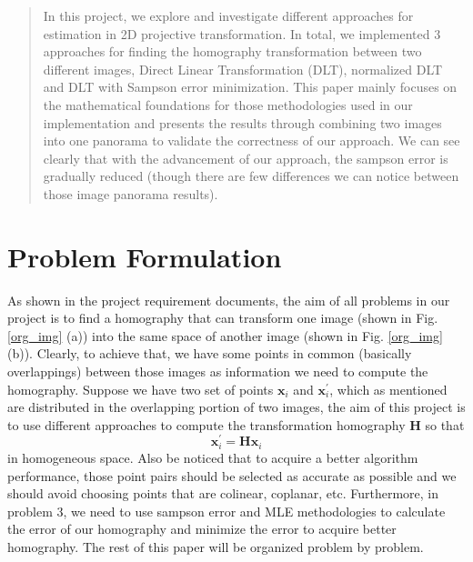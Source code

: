 \documentclass[conference]{IEEEtran}
\newcommand{\mat}[1]{\mathbf{#1}} %
\begin{document}




\maketitle
\begin{abstract}
In this project, we explore and investigate different approaches for estimation in 2D projective transformation. In total, we implemented 3 approaches for finding the homography transformation between two different images, Direct Linear Transformation (DLT), normalized DLT and DLT with Sampson error minimization. This paper mainly focuses on the mathematical foundations for those methodologies used in our implementation and presents the results through combining two images into one panorama to validate the correctness of our approach. We can see clearly that with the advancement of our approach, the sampson error is gradually reduced (though there are few differences we can notice between those image panorama results).
\end{abstract}





%
\IEEEpeerreviewmaketitle


\section{Problem Formulation}
As shown in the project requirement documents, the aim of all problems in our project is to find a homography that can transform one image (shown in Fig. \ref{org_img} (a)) into the same space of another image (shown in Fig. \ref{org_img} (b)). Clearly, to achieve that, we have some points in common (basically overlappings) between those images as information we need to compute the homography. Suppose we have two set of points $\mat{x}_i$ and $\mat{x}_i^\prime$, which as mentioned are distributed in the overlapping portion of two images, the aim of this project is to use different approaches to compute the transformation homography $\mat{H}$ so that
\begin{equation}
	\mat{x}_i^\prime = \mat{H}\mat{x}_i
\end{equation}
in homogeneous space. Also be noticed that to acquire a better algorithm performance, those point pairs should be selected as accurate as possible and we should avoid choosing points that are colinear, coplanar, etc. Furthermore, in problem 3, we need to use sampson error and MLE methodologies to calculate the error of our homography and minimize the error to acquire better homography. The rest of this paper will be organized problem by problem.
\end{document}
